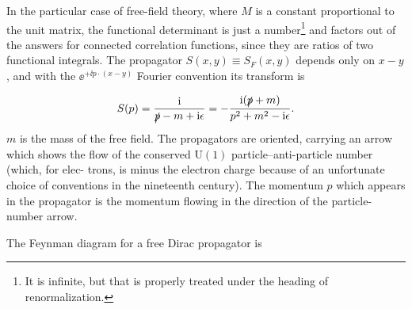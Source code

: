 In the particular case of free-field theory, where $M$ is a constant proportional to
the unit matrix, the functional determinant is just a number\footnote[11]{It is infinite, but that is properly treated under the heading of renormalization.} and factors out of the
answers for connected correlation functions, since they are ratios of two functional
integrals. The propagator $S(x,y)\equiv S_F(x,y)$ depends only on $x-y$, and with
the $\ee^{+\ii p\cdot(x-y)}$ Fourier convention its transform is

\begin{equation}
  S(p)=\frac{\mathrm{i}}{\slashed p-m+\mathrm{i}\epsilon}
  =-\frac{\mathrm{i}(\slashed p+m)}{p^2+m^2-\mathrm{i}\epsilon}.
  \label{eq:5.9}
\end{equation}
$m$ is the mass of the free field. The propagators are oriented, carrying an arrow which
shows the flow of the conserved $\mathrm{U}(1)$ particle--anti-particle number (which, for elec-
trons, is minus the electron charge because of an unfortunate choice of conventions
in the nineteenth century). The momentum $p$ which appears in the propagator is the
momentum flowing in the direction of the particle-number arrow.

The Feynman diagram for a free Dirac propagator is

\begin{center}

\end{center}
